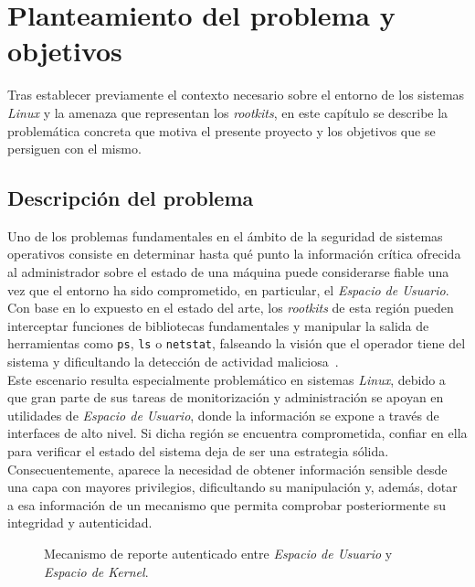 \chapter{Planteamiento del problema y objetivos}
\label{cap:capitulo4}

Tras establecer previamente el contexto necesario sobre el entorno de los sistemas \textit{Linux} y la amenaza que representan los \textit{rootkits}, en este capítulo se describe la problemática concreta que motiva el presente proyecto y los objetivos que se persiguen con el mismo.

\section{Descripción del problema}

Uno de los problemas fundamentales en el ámbito de la seguridad de sistemas operativos consiste en determinar hasta qué punto la información crítica ofrecida al administrador sobre el estado de una máquina puede considerarse fiable una vez que el entorno ha sido comprometido, en particular, el \textit{Espacio de Usuario}.
Con base en lo expuesto en el estado del arte, los \textit{rootkits} de esta región pueden interceptar funciones de bibliotecas fundamentales y manipular la salida de herramientas como \texttt{ps}, \texttt{ls} o \texttt{netstat}, falseando la visión que el operador tiene del sistema y dificultando la detección de actividad maliciosa~\cite{rootkits}.\\

Este escenario resulta especialmente problemático en sistemas \textit{Linux}, debido a que gran parte de sus tareas de monitorización y administración se apoyan en utilidades de \textit{Espacio de Usuario}, donde la información se expone a través de interfaces de alto nivel.
Si dicha región se encuentra comprometida, confiar en ella para verificar el estado del sistema deja de ser una estrategia sólida.
Consecuentemente, aparece la necesidad de obtener información sensible desde una capa con mayores privilegios, dificultando su manipulación y, además, dotar a esa información de un mecanismo que permita comprobar posteriormente su integridad y autenticidad.\\

\begin{figure}[h!]
  \centering
  \scalebox{0.9}{}
  \caption{Mecanismo de reporte autenticado entre \textit{Espacio de Usuario} y \textit{Espacio de Kernel}.}
  \label{fig:secure_reporting_scheme}
\end{figure}


